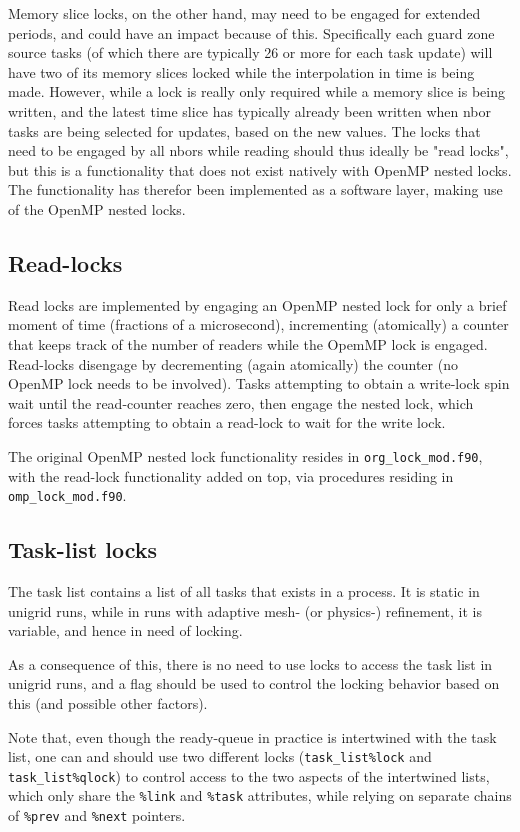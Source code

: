 \documentclass[paper=a4,fontsize=11pt]{scrartcl}
\numberwithin{equation}{section}		%
\numberwithin{figure}{section}			%
\numberwithin{table}{section}				%
\newcommand{\txtcolor}{\color{Mahogany}}
\newcommand{\codecolor}{\color{Blue}}
\newcommand{\Text}[1]{{\txtcolor\texttt{#1}}}
\newcommand{\Code}[1]{{\codecolor\texttt{#1}}}
\begin{document}
Memory slice locks, on the other hand, may need to be engaged for extended periods, and could have an impact because of this.  Specifically each guard zone source tasks (of which there are typically 26 or more for each task update) will have two of its memory slices locked while the interpolation in time is being made.  However, while a lock is really only required while a memory slice is being written, and the latest time slice has typically already been written when nbor tasks are being selected for updates, based on the new values.  The locks that need to be engaged by all nbors while reading should thus ideally be "read locks", but this is a functionality that does not exist natively with OpenMP nested locks.  The functionality has therefor been implemented as a software layer, making use of the OpenMP nested locks.

\subsection{Read-locks}
Read locks are implemented by engaging an OpenMP nested lock for only a brief moment of time (fractions of a microsecond), incrementing (atomically) a counter that keeps track of the number of readers while the OpemMP lock is engaged.  Read-locks disengage by decrementing (again atomically) the counter (no OpenMP lock needs to be involved).  Tasks attempting to obtain a write-lock spin wait until the read-counter reaches zero, then engage the nested lock, which forces tasks attempting to obtain a read-lock to wait for the write lock.

The original OpenMP nested lock functionality resides in \verb|org_lock_mod.f90|, with the read-lock functionality added on top, via procedures residing in \verb|omp_lock_mod.f90|.

\subsection{Task-list locks}
The task list contains a list of all tasks that exists in a process.  It is static in unigrid runs, while in runs with adaptive mesh- (or physics-) refinement, it is variable, and hence in need of locking.

As a consequence of this, there is no need to use locks to access the task list in unigrid runs, and a flag should be used to control the locking behavior based on this (and possible other factors).

Note that, even though the ready-queue in practice is intertwined with the task list, one can and should use two different locks (\Code{task\_list\%lock} and \Code{task\_list\%qlock}) to control access to the two aspects of the intertwined lists, which only share the \Text{\%link} and \Text{\%task} attributes, while relying on separate chains of \Text{\%prev} and \Text{\%next} pointers.
\end{document}
